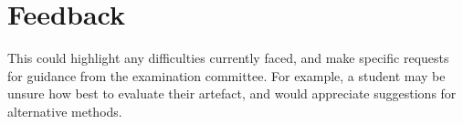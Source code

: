 \chapter*{Feedback}\label{C:feedback} 

This could highlight any difficulties currently faced, and make specific requests for guidance from the examination committee. For example, a student may be unsure how best to evaluate their artefact, and would appreciate suggestions for alternative methods. 
